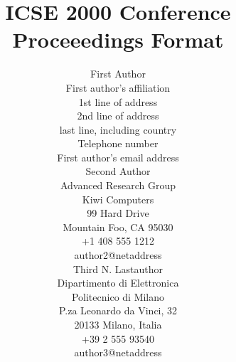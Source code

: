 



\title{ICSE 2000 Conference Proceeedings Format}

\author{
        \hspace*{-2ex}
        \parbox{2.3in} {\begin{center}
        {\authornamefont First Author}\\ 
        First author's affiliation\\
        1st line of address\\
        2nd line of address\\
        last line, including country \\
        Telephone number\\
        First author's email address
        \end{center} }
        \parbox{2.3in} {\begin{center}
        {\authornamefont Second Author}\\
        Advanced Research Group\\
        Kiwi Computers\\
        99 Hard Drive\\
        Mountain Foo, CA 95030\\
        +1 408 555 1212\\
        author2@netaddress
        \end{center} }
        \parbox{2.3in} {\begin{center}
        {\authornamefont Third N. Lastauthor}\\
        Dipartimento di Elettronica\\
        Politecnico di Milano\\
        P.za Leonardo da Vinci, 32\\
        20133 Milano, Italia\\
        +39 2 555 93540\\
        author3@netaddress
        \end{center} }
}



\maketitle
\copyrightspace
%
%


